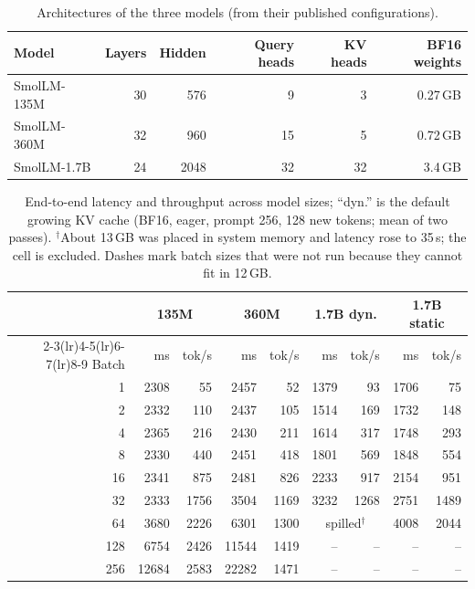 \documentclass[11pt]{article}
\begin{document}
\begin{table}[!htbp]
\centering
\begin{tabular}{lrrrrr}
\toprule
Model & Layers & Hidden & Query heads & KV heads & BF16 weights \\
\midrule
SmolLM-135M & 30 & 576 & 9 & 3 & 0.27\,GB \\
SmolLM-360M & 32 & 960 & 15 & 5 & 0.72\,GB \\
SmolLM-1.7B & 24 & 2048 & 32 & 32 & 3.4\,GB \\
\bottomrule
\end{tabular}
\caption{Architectures of the three models (from their published configurations).}
\label{tab:arch}
\end{table}

\begin{table}[!htbp]
\centering
\small
\setlength{\tabcolsep}{5pt}
\begin{tabular}{r *{8}{r}}
\toprule
 & \multicolumn{2}{c}{135M} & \multicolumn{2}{c}{360M} & \multicolumn{2}{c}{1.7B dyn.} & \multicolumn{2}{c}{1.7B static} \\
\cmidrule(lr){2-3}\cmidrule(lr){4-5}\cmidrule(lr){6-7}\cmidrule(lr){8-9}
Batch & ms & tok/s & ms & tok/s & ms & tok/s & ms & tok/s \\
\midrule
1 & 2308 & 55 & 2457 & 52 & 1379 & 93 & 1706 & 75 \\
2 & 2332 & 110 & 2437 & 105 & 1514 & 169 & 1732 & 148 \\
4 & 2365 & 216 & 2430 & 211 & 1614 & 317 & 1748 & 293 \\
8 & 2330 & 440 & 2451 & 418 & 1801 & 569 & 1848 & 554 \\
16 & 2341 & 875 & 2481 & 826 & 2233 & 917 & 2154 & 951 \\
32 & 2333 & 1756 & 3504 & 1169 & 3232 & 1268 & 2751 & 1489 \\
64 & 3680 & 2226 & 6301 & 1300 & \multicolumn{2}{c}{spilled$^\dagger$} & 4008 & 2044 \\
128 & 6754 & 2426 & 11544 & 1419 & -- & -- & -- & -- \\
256 & 12684 & 2583 & 22282 & 1471 & -- & -- & -- & -- \\
\bottomrule
\end{tabular}
\caption{End-to-end latency and throughput across model sizes; ``dyn.'' is the default growing KV cache (BF16, eager, prompt 256, 128 new tokens; mean of two passes). $^\dagger$About 13\,GB was placed in system memory and latency rose to 35\,s; the cell is excluded. Dashes mark batch sizes that were not run because they cannot fit in 12\,GB.}
\label{tab:models}
\end{table}
\end{document}
